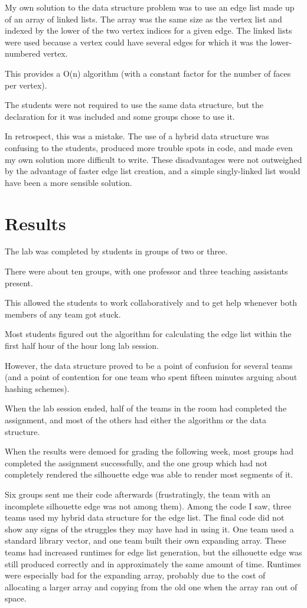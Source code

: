\documentclass[10pt,twocolumn]{article}
\begin{document}
My own solution to the data structure problem was to use an edge list made up of an array of linked lists.  The array was the same size as the vertex list and indexed by the lower of the two vertex indices for a given edge.  The linked lists were used because a vertex could have several edges for which it was the lower-numbered vertex.  

This provides a O(n) algorithm (with a constant factor for the number of faces per vertex).  

The students were not required to use the same data structure, but the declaration for it was included and some groups chose to use it.  

In retrospect, this was a mistake.  The use of a hybrid data structure was confusing to the students, produced more trouble spots in code, and made even my own solution more difficult to write.  These disadvantages were not outweighed by the advantage of faster edge list creation, and a simple singly-linked list would have been a more sensible solution.  

\section{Results}
The lab was completed by students in groups of two or three.  

There were about ten groups, with one professor and three teaching assistants present.  

This allowed the students to work collaboratively and to get help whenever both members of any team got stuck.  

Most students figured out the algorithm for calculating the edge list within the first half hour of the hour long lab session.  

However, the data structure proved to be a point of confusion for several teams (and a point of contention for one team who spent fifteen minutes arguing about hashing schemes).  

When the lab session ended, half of the teams in the room had completed the assignment, and most of the others had either the algorithm or the data structure.  

When the results were demoed for grading the following week, most groups had completed the assignment successfully, and the one group which had not completely rendered the silhouette edge was able to render most segments of it.  

Six groups sent me their code afterwards (frustratingly, the team with an incomplete silhouette edge was not among them).  Among the code I saw, three teams used my hybrid data structure for the edge list.  The final code did not show any signs of the struggles they may have had in using it.  One team used a standard library vector, and one team built their own expanding array.  These teams had increased runtimes for edge list generation, but the silhouette edge was still produced correctly and in approximately the same amount of time.  Runtimes were especially bad for the expanding array, probably due to the cost of allocating a larger array and copying from the old one when the array ran out of space.  
\end{document}
